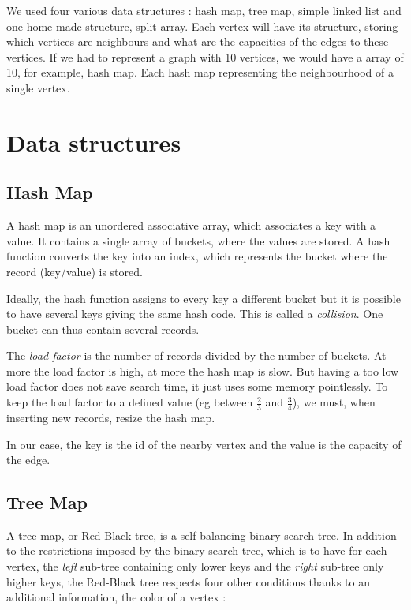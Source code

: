 We used four various data structures : hash map, tree map, simple linked list and one home-made structure, split array. Each vertex will have its structure, storing which vertices are neighbours and what are the capacities of the edges to these vertices. If we had to represent a graph with 10 vertices, we would have a array of 10, for example, hash map. Each hash map representing the neighbourhood of a single vertex.

\section{Data structures}
\subsection{Hash Map}
A hash map is an unordered associative array, which associates a key with a value. It contains a single array of buckets, where the values are stored. A hash function converts the key into an index, which represents the bucket where the record (key/value) is stored. \newline

Ideally, the hash function assigns to every key a different bucket but it is possible to have several keys giving the same hash code. This is called a \textit{collision}. One bucket can thus contain several records. \newline

The \textit{load factor} is the number of records divided by the number of buckets.  At more the load factor is high, at more the hash map is slow. But having a too low load factor does not save search time, it just uses some memory pointlessly. To keep the load factor to a defined value (eg between $\frac{2}{3}$ and $\frac{3}{4}$), we must, when inserting new records, resize the hash map. \newline

In our case, the key is the id of the nearby vertex and the value is the capacity of the edge.

\subsection{Tree Map}
A tree map, or Red-Black tree, is a self-balancing binary search tree. In addition to the restrictions imposed by the binary search tree, which is to have for each vertex, the \textit{left} sub-tree containing only lower keys and the \textit{right} sub-tree only higher keys, the Red-Black tree respects four other conditions thanks to an additional information, the color of a vertex :

